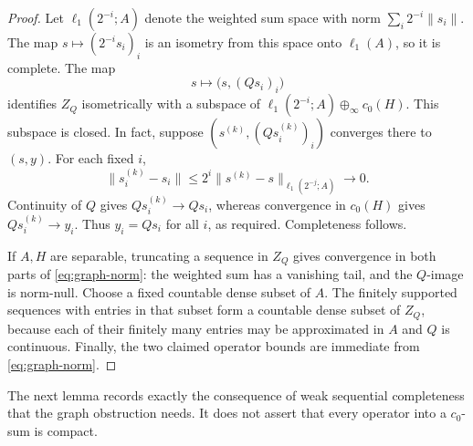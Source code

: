 \begin{proof}
Let \(\ell_1(2^{-i};A)\) denote the weighted sum space with norm
\(\sum_i2^{-i}\|s_i\|\). The map \(s\mapsto(2^{-i}s_i)_i\)
is an isometry from this space onto \(\ell_1(A)\), so it is complete.
The map
\[
 s\longmapsto \bigl(s,(Qs_i)_i\bigr)
\]
identifies \(Z_Q\) isometrically with a subspace of
\(\ell_1(2^{-i};A)\oplus_\infty c_0(H)\). This subspace is closed.
In fact, suppose \((s^{(k)},(Qs_i^{(k)})_i)\) converges there to
\((s,y)\). For each fixed \(i\),
\[
 \|s_i^{(k)}-s_i\|
 \le 2^i\|s^{(k)}-s\|_{\ell_1(2^{-j};A)}
 \longrightarrow0.
\]
Continuity of \(Q\) gives \(Qs_i^{(k)}\to Qs_i\), whereas convergence
in \(c_0(H)\) gives \(Qs_i^{(k)}\to y_i\). Thus \(y_i=Qs_i\) for all
\(i\), as required. Completeness follows.

If \(A,H\) are separable, truncating a sequence in \(Z_Q\) gives
convergence in both parts of
\eqref{eq:graph-norm}: the weighted sum has a vanishing tail, and the
\(Q\)-image is norm-null. Choose a fixed countable dense subset of
\(A\). The finitely supported sequences with entries in that subset
form a countable dense subset of \(Z_Q\), because each of their
finitely many entries may be approximated in \(A\) and \(Q\) is
continuous. Finally, the two claimed operator bounds are immediate
from \eqref{eq:graph-norm}.
\end{proof}

The next lemma records exactly the consequence of weak sequential
completeness that the graph obstruction needs. It does not assert
that every operator into a \(c_0\)-sum is compact.


